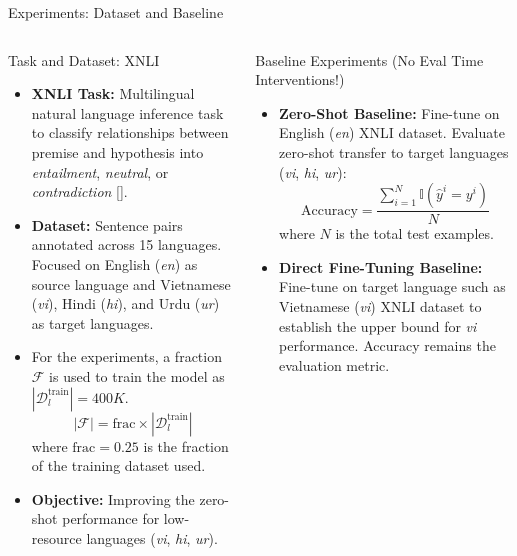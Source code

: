 \documentclass[aspectratio=169]{beamer}
\begin{document}
\begin{frame}{Experiments: Dataset and Baseline}
	\begin{columns}
		\begin{block}{\scriptsize Task and Dataset: XNLI}\scriptsize
			\begin{itemize}
				\item \textbf{XNLI Task:} Multilingual natural language inference task to classify relationships between premise and hypothesis into \textit{entailment}, \textit{neutral}, or \textit{contradiction} [\citeauthor{xnli}].
				\item \textbf{Dataset:} Sentence pairs annotated across 15 languages. Focused on English (\textit{en}) as source language and Vietnamese (\textit{vi}), Hindi (\textit{hi}), and Urdu (\textit{ur}) as target languages.
				\item For the experiments, a fraction \(\mathcal{F}\) is used to train the model as $|\mathcal{D}_l^\text{train}| = 400K$.
				\begin{equation}
					|\mathcal{F}| = \text{frac} \times |\mathcal{D}_l^\text{train}|
				\end{equation}
				where \(\text{frac} = 0.25\) is the fraction of the training dataset used.
				\item \textbf{Objective:} Improving the zero-shot performance for low-resource languages (\textit{vi}, \textit{hi}, \textit{ur}).
			\end{itemize}		  
		\end{block}
		\begin{block}{\scriptsize Baseline Experiments (No Eval Time Interventions!)}\scriptsize
			\begin{itemize}
				\item \textbf{Zero-Shot Baseline:} Fine-tune on English (\textit{en}) XNLI dataset. Evaluate zero-shot transfer to target languages (\textit{vi}, \textit{hi}, \textit{ur}):
				\begin{equation}
					\text{Accuracy} = \frac{\sum_{i=1}^N \mathbb{I}(\hat{y}^i = y^i)}{N}
				\end{equation}
				where \(N\) is the total test examples.
				\item \textbf{Direct Fine-Tuning Baseline:} Fine-tune on target language such as Vietnamese (\textit{vi}) XNLI dataset to establish the upper bound for \textit{vi} performance. Accuracy remains the evaluation metric.
			\end{itemize}
		\end{block}
	\end{columns}
\end{frame}
\end{document}
